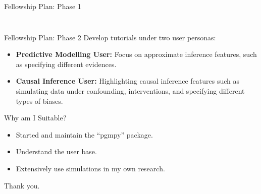 \documentclass{beamer}
\begin{document}
\begin{frame}[fragile]{Fellowship Plan: Phase 1}
\begin{columns}
\begin{column}{0.4\textwidth}
\begin{figure}
			\end{figure}
		\end{column}
	\end{columns}
\end{frame}

\begin{frame}{Fellowship Plan: Phase 2}
	Develop tutorials under two user personas:

	\vspace{2em}

	\begin{itemize}
		\item \textbf{Predictive Modelling User:} Focus on approximate inference features, such as specifying different evidences.
		\vspace{1em}
		\item \textbf{Causal Inference User:} Highlighting causal inference features such as simulating data under confounding, interventions, and specifying different types of biases.
	\end{itemize}
\end{frame}

\begin{frame}{Why am I Suitable?}
	\begin{itemize}
		\item Started and maintain the ``pgmpy'' package.
		\item Understand the user base. 
		\item Extensively use simulations in my own research.
	\end{itemize}
\end{frame}

\begin{frame}
	\huge{Thank you.}
\end{frame}
\end{document}
